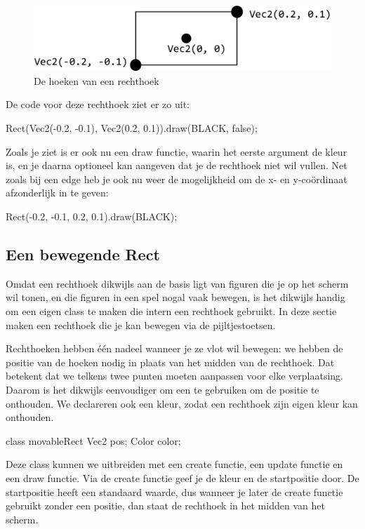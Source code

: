 \begin{figure}[h]
\centering
\includegraphics[width=0.8\linewidth]{../images/rectangle}
\caption[]{De hoeken van een rechthoek}
\label{fig:rect}
\end{figure}

De code voor deze rechthoek ziet er zo uit:

\begin{code}
Rect(Vec2(-0.2, -0.1), Vec2(0.2, 0.1)).draw(BLACK, false);
\end{code}

Zoals je ziet is er ook nu een draw functie, waarin het eerste argument de kleur is, en je daarna optioneel kan aangeven dat je de rechthoek niet wil vullen. Net zoals bij een edge heb je ook nu weer de mogelijkheid om de x- en y-co\"ordinaat afzonderlijk in te geven:

\begin{code}
Rect(-0.2, -0.1, 0.2, 0.1).draw(BLACK);
\end{code}

\subsection{Een bewegende Rect}
Omdat een rechthoek dikwijls aan de basis ligt van figuren die je op het scherm wil tonen, en die figuren in een spel nogal vaak bewegen, is het dikwijls handig om een eigen class te maken die intern een rechthoek gebruikt. In deze sectie maken een rechthoek die je kan bewegen via de pijltjestoetsen.

Rechthoeken hebben \'e\'en nadeel wanneer je ze vlot wil bewegen: we hebben de positie van de hoeken nodig in plaats van het midden van de rechthoek. Dat betekent dat we telkens twee punten moeten aanpassen voor elke verplaatsing. Daarom is het dikwijls eenvoudiger om een  te gebruiken om de positie te onthouden. We declareren ook een kleur, zodat een rechthoek zijn eigen kleur kan onthouden.

\begin{code}
class movableRect {
  Vec2 pos;
	Color color;
}
\end{code}

Deze class kunnen we uitbreiden met een create functie, een update functie en een draw functie. Via de create functie geef je de kleur en de startpositie door. De startpositie heeft een standaard waarde, dus wanneer je later de create functie gebruikt zonder een positie, dan staat de rechthoek in het midden van het scherm.

